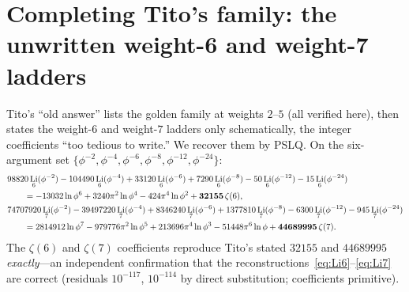 \documentclass[11pt]{article}
\DeclareMathOperator{\Li}{Li}
\newcommand{\lp}{\ln\phi}
\theoremstyle{plain}\newtheorem{theorem}{Theorem}\newtheorem{proposition}[theorem]{Proposition}
\theoremstyle{remark}\newtheorem{remark}[theorem]{Remark}
\begin{document}
\section{Completing Tito's family: the unwritten weight-6 and weight-7 ladders}
Tito's ``old answer'' lists the golden family at weights $2$--$5$ (all verified here), then states the weight-$6$
and weight-$7$ ladders only schematically, the integer coefficients ``too tedious to write.'' We recover them by
PSLQ. On the six-argument set $\{\phi^{-2},\phi^{-4},\phi^{-6},\phi^{-8},\phi^{-12},\phi^{-24}\}$:
{\footnotesize
\begin{align}
\label{eq:Li6}
  &98820\Li_6(\phi^{-2})-104490\Li_6(\phi^{-4})+33120\Li_6(\phi^{-6})+7290\Li_6(\phi^{-8})-50\Li_6(\phi^{-12})-15\Li_6(\phi^{-24})\notag\\
  &\qquad=-13032\lp^6+3240\pi^2\lp^4-424\pi^4\lp^2+\mathbf{32155}\,\zeta(6),\\
\label{eq:Li7}
  &74707920\Li_7(\phi^{-2})-39497220\Li_7(\phi^{-4})+8346240\Li_7(\phi^{-6})+1377810\Li_7(\phi^{-8})-6300\Li_7(\phi^{-12})-945\Li_7(\phi^{-24})\notag\\
  &\qquad=2814912\lp^7-979776\pi^2\lp^5+213696\pi^4\lp^3-51448\pi^6\lp+\mathbf{44689995}\,\zeta(7).
\end{align}}
The $\zeta(6)$ and $\zeta(7)$ coefficients reproduce Tito's stated $32155$ and $44689995$ \emph{exactly}---an
independent confirmation that the reconstructions~\eqref{eq:Li6}--\eqref{eq:Li7} are correct (residuals
$10^{-117}$, $10^{-114}$ by direct substitution; coefficients primitive).
\end{document}
